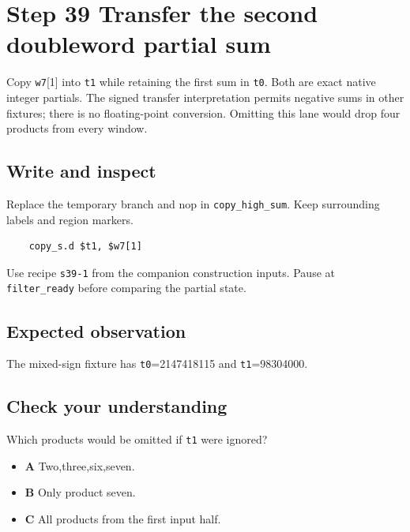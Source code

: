\section{Step 39 Transfer the second doubleword partial sum}\label{fir-s39}

Copy \texttt{w7}[1] into \texttt{t1} while retaining the first sum in \texttt{t0}. Both are exact native integer partials. The signed transfer interpretation permits negative sums in other fixtures; there is no floating-point conversion. Omitting this lane would drop four products from every window.

\subsection{Write and inspect}
Replace the temporary branch and nop in \texttt{copy\_high\_sum}. Keep surrounding labels and region markers.

\begin{verbatim}
    copy_s.d $t1, $w7[1]
\end{verbatim}
Use recipe \texttt{s39-1} from the companion construction inputs. Pause at \texttt{filter\_ready} before comparing the partial state.

\subsection{Expected observation}
The mixed-sign fixture has \texttt{t0}=2147418115 and \texttt{t1}=98304000.

\subsection{Check your understanding}
Which products would be omitted if \texttt{t1} were ignored?

\begin{itemize}
  \item \textbf{A} Two,three,six,seven.
  \item \textbf{B} Only product seven.
  \item \textbf{C} All products from the first input half.
\end{itemize}
